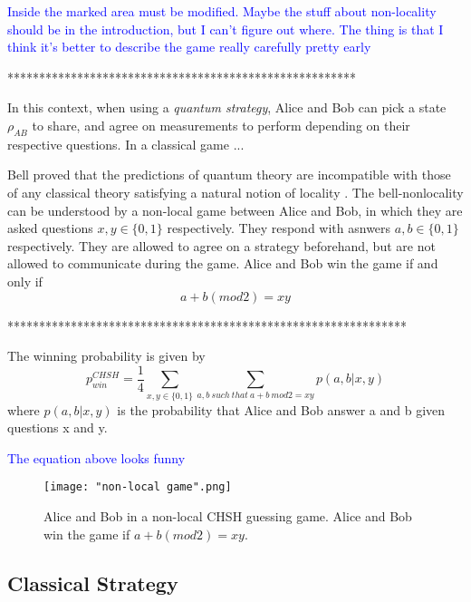 \textcolor{blue}{Inside the marked area must be modified.  Maybe the stuff about non-locality should be in the introduction, but I can't figure out where.  The thing is that I think it's better to describe the game really carefully pretty early}



*******************************************************

In this context, when using a \textit{quantum strategy}, Alice and Bob can pick a state $\rho_{AB}$ to share, and agree on measurements to perform depending on their respective questions. In a classical game ...

Bell proved that the predictions of quantum theory are incompatible with those of any classical theory satisfying a natural notion of locality \cite{bell1964}. The bell-nonlocality can be understood by a non-local game between Alice and Bob, in which they are asked questions $x,y \in \{0,1\}$ respectively. They respond with asnwers $a, b \in \{0,1\}$ respectively. They are allowed to agree on a strategy beforehand, but are not allowed to communicate during the game. Alice and Bob win the game if and only if 
\begin{equation*}
 a+b (mod 2)=xy    
\end{equation*}

***************************************************************


The winning probability is given by 
\begin{equation*}
    p^{CHSH}_{win} = \frac{1}{4}\sum_{x,y \in \{0,1\}} \sum_{a, b \: such \: that \: a+b \: mod 2 = xy} p(a,b|x,y)
\end{equation*}
where $p(a,b|x,y)$ is the probability that Alice and Bob answer a and b given questions x and y.



\textcolor{blue}{The equation above looks funny}

\begin{figure}[h]
    \centering
    \texttt{[image: "non-local game".png]}
    \caption{Alice and Bob in a non-local CHSH guessing game. Alice and Bob win the game if $a+b (mod2)=xy$.}
    \label{fig:non-local game}
\end{figure}



\subsection{Classical Strategy}

